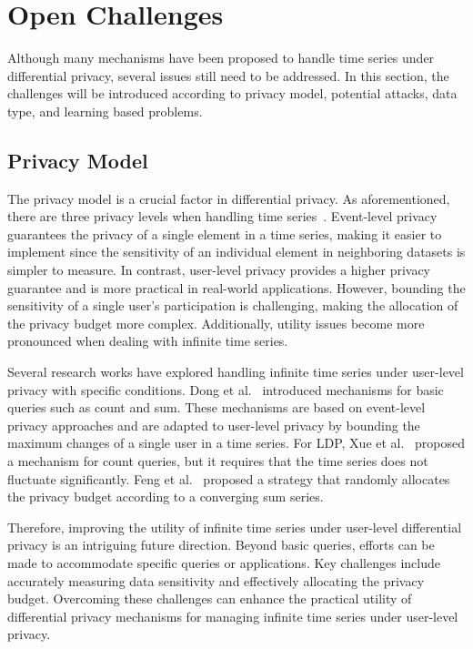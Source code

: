 \section{Open Challenges}\label{sec7}
Although many mechanisms have been proposed to handle time series under differential privacy, several issues still need to be addressed. In this section, the challenges will be introduced according to privacy model, potential attacks, data type, and learning based problems.

\subsection{Privacy Model}  
The privacy model is a crucial factor in differential privacy. As aforementioned, there are three privacy levels when handling time series~\cite{Kellaris14}. Event-level privacy guarantees the privacy of a single element in a time series, making it easier to implement since the sensitivity of an individual element in neighboring datasets is simpler to measure. In contrast, user-level privacy provides a higher privacy guarantee and is more practical in real-world applications. However, bounding the sensitivity of a single user's participation is challenging, making the allocation of the privacy budget more complex. Additionally, utility issues become more pronounced when dealing with infinite time series.

Several research works have explored handling infinite time series under user-level privacy with specific conditions. Dong et al.~\cite{dong2023continual} introduced mechanisms for basic queries such as count and sum. These mechanisms are based on event-level privacy approaches and are adapted to user-level privacy by bounding the maximum changes of a single user in a time series. For LDP, Xue et al.~\cite{xue2022ddrm} proposed a mechanism for count queries, but it requires that the time series does not fluctuate significantly. Feng et al.~\cite{feng2023dpi} proposed a strategy that randomly allocates the privacy budget according to a converging sum series.

Therefore, improving the utility of infinite time series under user-level differential privacy is an intriguing future direction. Beyond basic queries, efforts can be made to accommodate specific queries or applications. Key challenges include accurately measuring data sensitivity and effectively allocating the privacy budget. Overcoming these challenges can enhance the practical utility of differential privacy mechanisms for managing infinite time series under user-level privacy.


